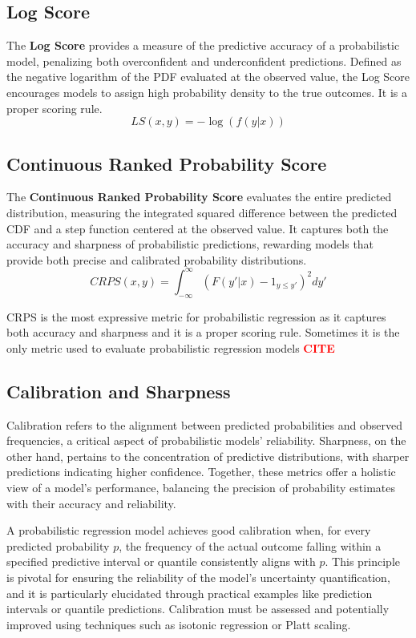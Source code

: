 \documentclass{article}
\newcommand{\citee}[1]{\textbf{\textcolor{red}{CITE}}}
\begin{document}
\subsection{Log Score}
The \textbf{Log Score} provides a measure of the predictive accuracy of a probabilistic model, penalizing both overconfident and underconfident predictions. Defined as the negative logarithm of the PDF evaluated at the observed value, the Log Score encourages models to assign high probability density to the true outcomes. It is a proper scoring rule.
\begin{equation}
    LS(x, y) = -\log(f(y|x))
\end{equation}

\subsection{Continuous Ranked Probability Score}
The \textbf{Continuous Ranked Probability Score} evaluates the entire predicted distribution, measuring the integrated squared difference between the predicted CDF and a step function centered at the observed value. It captures both the accuracy and sharpness of probabilistic predictions, rewarding models that provide both precise and calibrated probability distributions.
\begin{equation}
    CRPS(x, y) = \int_{-\infty}^{\infty} (F(y'|x) - \mathrm{1}_{y \leq y'})^2 dy'
\end{equation}

CRPS is the most expressive metric for probabilistic regression as it captures both accuracy and sharpness and it is a proper scoring rule. Sometimes it is the only metric used to evaluate probabilistic regression models \citee. 

\subsection{Calibration and Sharpness}
Calibration refers to the alignment between predicted probabilities and observed frequencies, a critical aspect of probabilistic models' reliability. Sharpness, on the other hand, pertains to the concentration of predictive distributions, with sharper predictions indicating higher confidence. Together, these metrics offer a holistic view of a model's performance, balancing the precision of probability estimates with their accuracy and reliability.

A probabilistic regression model achieves good calibration when, for every predicted probability $p$, the frequency of the actual outcome falling within a specified predictive interval or quantile consistently aligns with $p$. This principle is pivotal for ensuring the reliability of the model's uncertainty quantification, and it is particularly elucidated through practical examples like prediction intervals or quantile predictions.
Calibration must be assessed and potentially improved using techniques such as isotonic regression or Platt scaling.
\end{document}
